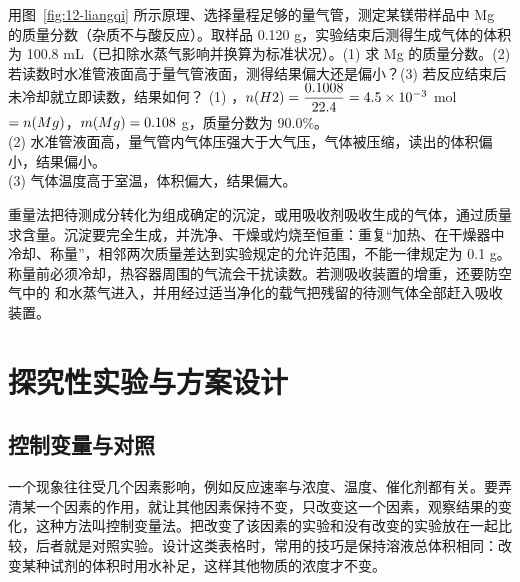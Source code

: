 \begin{liti}[典型·气体体积法测定纯度]
用图~\ref{fig:12-liangqi} 所示原理、选择量程足够的量气管，测定某镁带样品中 Mg 的质量分数（杂质不与酸反应）。取样品 0.120 g，实验结束后测得生成气体的体积为 100.8 mL（已扣除水蒸气影响并换算为标准状况）。(1) 求 Mg 的质量分数。(2) 若读数时水准管液面高于量气管液面，测得结果偏大还是偏小？(3) 若反应结束后未冷却就立即读数，结果如何？
\tcblower
\jie (1) ，$n(H2)=\dfrac{0.1008}{22.4}=4.5\times10^{-3}$ mol $=n(Mg)$，$m(Mg)=0.108$ g，质量分数为 90.0\%。\\
(2) 水准管液面高，量气管内气体压强大于大气压，气体被压缩，读出的体积偏小，结果偏小。\\
(3) 气体温度高于室温，体积偏大，结果偏大。
\end{liti}

重量法把待测成分转化为组成确定的沉淀，或用吸收剂吸收生成的气体，通过质量求含量。沉淀要完全生成，并洗净、干燥或灼烧至恒重：重复“加热、在干燥器中冷却、称量”，相邻两次质量差达到实验规定的允许范围，不能一律规定为 0.1 g。称量前必须冷却，热容器周围的气流会干扰读数。若测吸收装置的增重，还要防空气中的  和水蒸气进入，并用经过适当净化的载气把残留的待测气体全部赶入吸收装置。

\section{探究性实验与方案设计}

\subsection{控制变量与对照}

一个现象往往受几个因素影响，例如反应速率与浓度、温度、催化剂都有关。要弄清某一个因素的作用，就让其他因素保持不变，只改变这一个因素，观察结果的变化，这种方法叫控制变量法。把改变了该因素的实验和没有改变的实验放在一起比较，后者就是对照实验。设计这类表格时，常用的技巧是保持溶液总体积相同：改变某种试剂的体积时用水补足，这样其他物质的浓度才不变。

